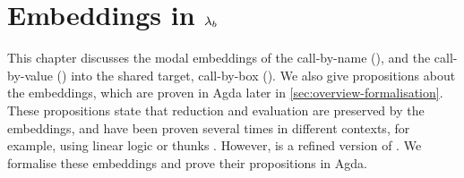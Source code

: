 \chapter{\texorpdfstring{Embeddings in \boldmath${\lambda_b}$}{Embeddings in the boxed lambda calculus}}
\label{chap:embeddings}

This chapter discusses the modal embeddings of the call-by-name \lc (\lan), and the call-by-value \lc (\lav) 
into the shared target, call-by-box \lc (\lab).
We also give propositions about the embeddings, which are proven in Agda later in \cref{sec:overview-formalisation}.
These propositions state that reduction and evaluation are preserved by the embeddings, 
and have been proven several times in different contexts, for example, using linear logic or thunks \cite{EhrhardGuerrieri2016,HATCLIFF_DANVY_1997,MARAIST1999175}.
However, \lab is a refined version of \labox \cite{espritosanto_et_al:LIPIcs:2019:10525}.
We formalise these embeddings and prove their propositions in Agda. 



